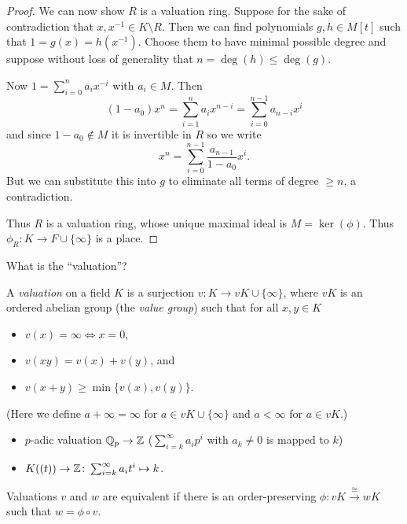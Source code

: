 \begin{proof}
    We can now show $R$ is a valuation ring.
    Suppose for the sake of contradiction that $x, x^{-1} \in K \setminus R$.
    Then we can find polynomials $g, h \in M[t]$ such that $1 = g(x) = h(x^{-1})$.
    Choose them to have minimal possible degree and suppose without loss of generality that $n = \deg(h) \leq \deg(g)$.

    Now $1 = \sum_{i=0}^n a_i x^{-i}$ with $a_i \in M$.
    Then \[
        (1 - a_0) x^n = \sum_{i=1}^n a_i x^{n-i} = \sum_{i=0}^{n-1} a_{n-i} x^i
    \] and since $1 - a_0 \notin M$ it is invertible in $R$ so we write \[
        x^n = \sum_{i=0}^{n-1} \frac{a_{n-1}}{1 - a_0} x^i.
    \] But we can substitute this into $g$ to eliminate all terms of degree $\geq n$, a contradiction.

    Thus $R$ is a valuation ring, whose unique maximal ideal is $M = \ker(\phi)$.
    Thus $\phi_R \colon K \to F \cup \{\infty\}$ is a place.
\end{proof}

What is the ``valuation''?

\begin{definition}
    A \emph{valuation} on a field $K$ is a surjection $v \colon K \to vK \cup \{\infty\}$, where $vK$ is an ordered abelian group (the \emph{value group}) such that for all $x, y \in K$
    \begin{itemize}
        \item $v(x) = \infty \iff x = 0$,
        \item $v(xy) = v(x) + v(y)$, and
        \item $v(x+y) \geq \min \{ v(x), v(y) \}$.
    \end{itemize}
    (Here we define $a + \infty = \infty$ for $a \in vK \cup \{\infty\}$ and $a < \infty$ for $a \in vK$.)
\end{definition}

\begin{example}
    \begin{itemize}
        \item $p$-adic valuation $\mathbb{Q}_p \to \mathbb{Z}$ ($\sum_{i=k}^\infty a_i p^i$ with $a_k \neq 0$ is mapped to $k$)
        \item $K((t)) \to \mathbb{Z} \colon \sum_{i = k}^\infty a_i t^i \mapsto k$.
    \end{itemize}
\end{example}

Valuations $v$ and $w$ are equivalent if there is an order-preserving $\phi \colon vK \overset{\cong}{\to} wK$ such that $w = \phi \circ v$.

